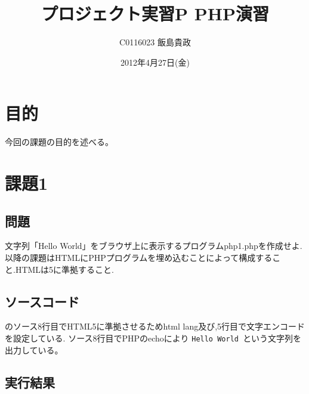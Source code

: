\documentclass[a4j,10pt]{jsarticle}
\title{プロジェクト実習P PHP演習}
\author{C0116023 飯島貴政}
\date{2012年4月27日(金)}
\begin{document}
\maketitle


\section{目的}

今回の課題の目的を述べる。

\lstset{
    language = PHP,
    breaklines = true,
    breakindent = 10pt,
    basicstyle = \ttfamily\scriptsize,
    classoffset = 0,
    frame = TBrl,
    framesep = 5pt,
    numbers = left,
    stepnumber = 1,
    numberstyle = \tiny,
    tabsize = 4,
    captionpos = t
}

\section{課題1}

\subsection{問題}

文字列「Hello World」をブラウザ上に表示するプログラムphp1.phpを作成せよ.
以降の課題はHTMLにPHPプログラムを埋め込むことによって構成すること.HTMLは5に準拠すること.


\subsection{ソースコード}



のソース8行目でHTML5に準拠させるためhtml lang及び,5行目で文字エンコードを設定している.
ソース8行目でPHPのechoにより {\tt Hello World }という文字列を出力している。

\subsection{実行結果}
\end{document}
